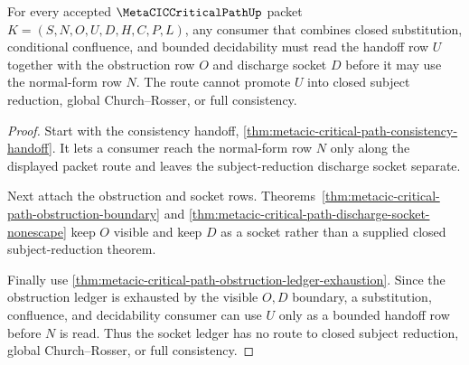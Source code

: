\begin{theorem}
\label{thm:metacic-critical-path-substitution-confluence-socket-ledger}
For every accepted $\MetaCICCriticalPathUp$ packet $K=(S,N,O,U,D,H,C,P,L)$, any consumer that combines closed substitution, conditional confluence, and bounded decidability must read the handoff row $U$ together with the obstruction row $O$ and discharge socket $D$ before it may use the normal-form row $N$. The route cannot promote $U$ into closed subject reduction, global Church--Rosser, or full consistency.
\end{theorem}
\begin{proof}
Start with the consistency handoff, \autoref{thm:metacic-critical-path-consistency-handoff}. It lets a consumer reach the normal-form row $N$ only along the displayed packet route and leaves the subject-reduction discharge socket separate.

Next attach the obstruction and socket rows. Theorems~\ref{thm:metacic-critical-path-obstruction-boundary} and \ref{thm:metacic-critical-path-discharge-socket-nonescape} keep $O$ visible and keep $D$ as a socket rather than a supplied closed subject-reduction theorem.

Finally use \autoref{thm:metacic-critical-path-obstruction-ledger-exhaustion}. Since the obstruction ledger is exhausted by the visible $O,D$ boundary, a substitution, confluence, and decidability consumer can use $U$ only as a bounded handoff row before $N$ is read. Thus the socket ledger has no route to closed subject reduction, global Church--Rosser, or full consistency.
\end{proof}

